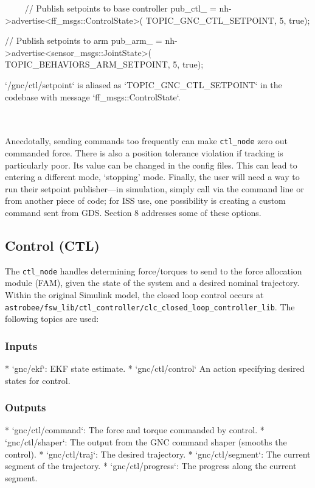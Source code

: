 \documentclass{article}
\begin{document}
\begin{markdown}
~~~~
//  Publish setpoints to base controller
pub_ctl_ = nh->advertise<ff_msgs::ControlState>(
TOPIC_GNC_CTL_SETPOINT, 5, true);

//  Publish setpoints to arm
pub_arm_ = nh->advertise<sensor_msgs::JointState>(
TOPIC_BEHAVIORS_ARM_SETPOINT, 5, true);
~~~~

`/gnc/ctl/setpoint` is aliased as `TOPIC_GNC_CTL_SETPOINT` in the codebase with message `ff_msgs::ControlState`.
\end{markdown}
\\\\
\indent Anecdotally, sending commands too frequently can make \texttt{ctl\_node} zero out commanded force. There is also a position tolerance violation if tracking is particularly poor. Its value can be changed in the config files. This can lead to entering a different mode, `stopping' mode. Finally, the user will need a way to run their setpoint publisher---in simulation, simply call via the command line or from another piece of code; for ISS use, one possibility is creating a custom command sent from GDS. Section 8 addresses some of these options.



\subsection{Control (CTL)}

The \texttt{ctl\_node} handles determining force/torques to send to the force allocation module (FAM), given the state of the system and a desired nominal trajectory. Within the original Simulink model, the closed loop control occurs at \texttt{astrobee/fsw\_lib/ctl\_controller/clc\_closed\_loop\_controller\_lib}.
The following topics are used:

\subsubsection{Inputs}
\begin{markdown}
* `gnc/ekf`: EKF state estimate.
* `gnc/ctl/control` An action specifying desired states for control.
\end{markdown}

\subsubsection{Outputs}
\begin{markdown}
* `gnc/ctl/command`: The force and torque commanded by control.
* `gnc/ctl/shaper`: The output from the GNC command shaper (smooths the control).
* `gnc/ctl/traj`: The desired trajectory.
* `gnc/ctl/segment`: The current segment of the trajectory.
* `gnc/ctl/progress`: The progress along the current segment.
\end{markdown}
\end{document}
